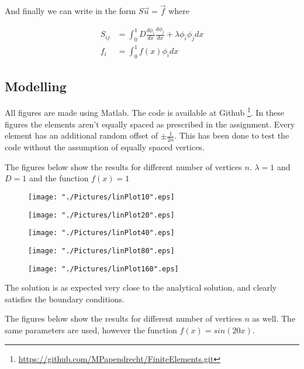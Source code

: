 \documentclass[10pt,a4paper]{article}
\begin{document}
And finally we can write in the form $S \vec{u} = \vec{f}$ where 

\begin{align}
S_{ij} &= \int_0^1 D \frac{d \phi_i}{dx} \frac{d \phi_j}{dx} + \lambda \phi_i \phi_j dx \\
f_i &= \int_0^1 f(x) \phi_i dx
\end{align}

\subsection{Modelling}
All figures are made using Matlab. 
The code is available at Github \footnote{ \label{fn:url} \url{https://github.com/MPapendrecht/FiniteElements.git}}. 
In these figures the elements aren't equally spaced as prescribed in the assignment. 
Every element has an additional random offset of $\pm \frac{1}{2n}$. 
This has been done to test the code without the assumption of equally spaced vertices.

\def\scale{0.20}

The figures below show the results for different number of vertices $n$. $\lambda = 1$ and $D = 1$ and the function $f(x)=1$
\begin{figure}[H]
	\centering
	\texttt{[image: "./Pictures/linPlot10".eps]}
\end{figure}
\begin{figure}[H]
	\centering
	\texttt{[image: "./Pictures/linPlot20".eps]}
\end{figure}
\begin{figure}[H]
	\centering
	\texttt{[image: "./Pictures/linPlot40".eps]}
\end{figure}
\begin{figure}[H]
	\centering
	\texttt{[image: "./Pictures/linPlot80".eps]}
\end{figure}
\begin{figure}[H]
	\centering
	\texttt{[image: "./Pictures/linPlot160".eps]}
\end{figure}

The solution is as expected very close to the analytical solution, and clearly satisfies the boundary conditions. 

The figures below show the results for different number of vertices $n$ as well. The same parameters are used, however the function $f(x)=sin(20x)$.
\end{document}
